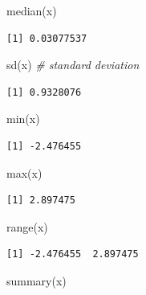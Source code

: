 \documentclass[
]{book}
\newenvironment{Shaded}{\begin{snugshade}}{\end{snugshade}}
\newcommand{\CommentTok}[1]{\textcolor[rgb]{0.56,0.35,0.01}{\textit{#1}}}
\newcommand{\FunctionTok}[1]{\textcolor[rgb]{0.00,0.00,0.00}{#1}}
\newcommand{\NormalTok}[1]{#1}
\begin{document}
\begin{Shaded}
\begin{Highlighting}[]
\FunctionTok{median}\NormalTok{(x)}
\end{Highlighting}
\end{Shaded}

\begin{verbatim}
[1] 0.03077537
\end{verbatim}

\begin{Shaded}
\begin{Highlighting}[]
\FunctionTok{sd}\NormalTok{(x) }\CommentTok{\# standard deviation}
\end{Highlighting}
\end{Shaded}

\begin{verbatim}
[1] 0.9328076
\end{verbatim}

\begin{Shaded}
\begin{Highlighting}[]
\FunctionTok{min}\NormalTok{(x)}
\end{Highlighting}
\end{Shaded}

\begin{verbatim}
[1] -2.476455
\end{verbatim}

\begin{Shaded}
\begin{Highlighting}[]
\FunctionTok{max}\NormalTok{(x)}
\end{Highlighting}
\end{Shaded}

\begin{verbatim}
[1] 2.897475
\end{verbatim}

\begin{Shaded}
\begin{Highlighting}[]
\FunctionTok{range}\NormalTok{(x)}
\end{Highlighting}
\end{Shaded}

\begin{verbatim}
[1] -2.476455  2.897475
\end{verbatim}

\begin{Shaded}
\begin{Highlighting}[]
\FunctionTok{summary}\NormalTok{(x)}
\end{Highlighting}
\end{Shaded}
\end{document}
